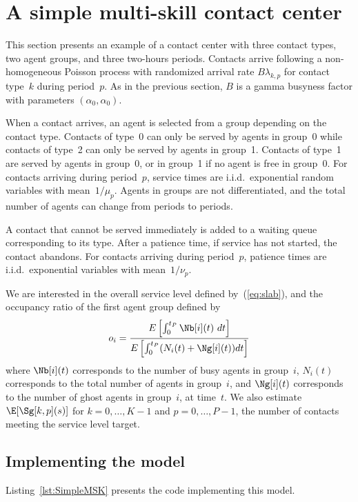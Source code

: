\section{A simple multi-skill contact center}
\label{sec:SimpleMSK}

This section presents an example of a contact center with three
contact types, two
agent groups, and three two-hours periods.  Contacts arrive
following a non-homogeneous Poisson process
with randomized arrival rate
$B\lambda_{k, p}$ for contact type~$k$ during period~$p$.
As in the previous section,
$B$ is a gamma busyness factor with parameters
$(\alpha_0, \alpha_0)$.

When a contact arrives, an agent is selected from a group depending on
the contact type.  Contacts of type~0 can only be served by agents in
group~0 while contacts of type~2 can only be served by agents in
group~1.  Contacts of type~1 are served by agents in group~0, or
in group~1 if no agent is free in group~0.
For contacts arriving during period~$p$,
service times are i.i.d.\ exponential random variables with
mean~$1/\mu_p$.
Agents in groups are not differentiated, and the total number of
agents can change from periods to periods.

A contact that cannot be served immediately is added to a waiting
queue corresponding to its type.  After a patience time, if service
has not started, the contact abandons.  For contacts arriving during
period~$p$,
patience times are i.i.d.\ exponential variables with mean~$1/\nu_p$.

We are interested in the overall service level defined
by~(\ref{eq:slab}), and the occupancy ratio
of the first agent group defined by
\begin{equation}
o_i=\frac{E\left[\int_0^{t_P} \Nb[i](t)\
    dt\right]}{E\left[\int_0^{t_P} (N_i(t)+\Ng[i](t))
    dt\right]}\label{eq:occi}
\end{equation}
where $\Nb[i](t)$ corresponds to the number of busy agents in
group~$i$, $N_i(t)$ corresponds to the total number of agents in group~$i$,
and $\Ng[i](t)$ corresponds to the number of ghost agents in
group~$i$, at time~$t$.
We also estimate $\E[\Sg[k, p](s)]$ for $k=0,\ldots,K-1$ and
$p=0,\ldots,P-1$, the number of contacts meeting the service level
target.

\subsection{Implementing the model}

Listing~\ref{lst:SimpleMSK} presents the code implementing this
model.

